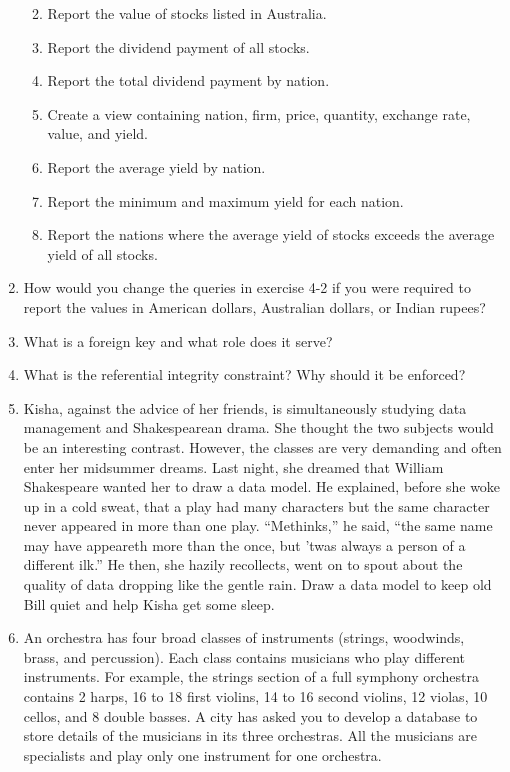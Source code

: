 \documentclass[
]{article}
\begin{document}
\begin{enumerate}
  \begin{enumerate}
  \def\labelenumii{\alph{enumii}.}
  \item
    Report the value of stocks listed in Australia.
  \item
    Report the dividend payment of all stocks.
  \item
    Report the total dividend payment by nation.
  \item
    Create a view containing nation, firm, price, quantity, exchange
    rate, value, and yield.
  \item
    Report the average yield by nation.
  \item
    Report the minimum and maximum yield for each nation.
  \item
    Report the nations where the average yield of stocks exceeds the
    average yield of all stocks.
  \end{enumerate}
\item
  How would you change the queries in exercise 4-2 if you were
  required to report the values in American dollars, Australian
  dollars, or Indian rupees?
\item
  What is a foreign key and what role does it serve?
\item
  What is the referential integrity constraint? Why should it be
  enforced?
\item
  Kisha, against the advice of her friends, is simultaneously studying
  data management and Shakespearean drama. She thought the two
  subjects would be an interesting contrast. However, the classes are
  very demanding and often enter her midsummer dreams. Last night, she
  dreamed that William Shakespeare wanted her to draw a data model. He
  explained, before she woke up in a cold sweat, that a play had many
  characters but the same character never appeared in more than one
  play. ``Methinks,'' he said, ``the same name may have appeareth more
  than the once, but 'twas always a person of a different ilk.'' He
  then, she hazily recollects, went on to spout about the quality of
  data dropping like the gentle rain. Draw a data model to keep old
  Bill quiet and help Kisha get some sleep.
\item
  An orchestra has four broad classes of instruments (strings,
  woodwinds, brass, and percussion). Each class contains musicians who
  play different instruments. For example, the strings section of a
  full symphony orchestra contains 2 harps, 16 to 18 first violins, 14
  to 16 second violins, 12 violas, 10 cellos, and 8 double basses. A
  city has asked you to develop a database to store details of the
  musicians in its three orchestras. All the musicians are specialists
  and play only one instrument for one orchestra.
\end{enumerate}
\end{document}
